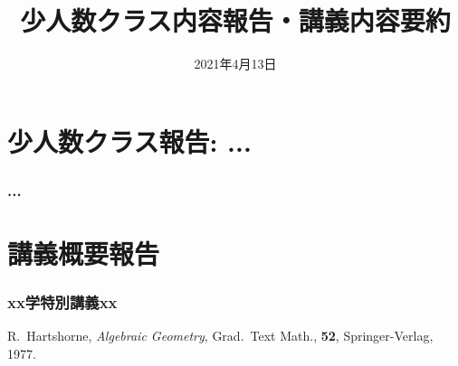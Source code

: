 \documentclass[final,dvipdfmx]{jlreq}
\title{少人数クラス内容報告・講義内容要約}
\author{}%
\date{2021年4月13日}%
\numberwithin{equation}{section}
\numberwithin{figure}{section}
\numberwithin{table}{section}
\theoremstyle{definition}
\begin{document}
\maketitle

\newpage
\setcounter{tocdepth}{2}
\tableofcontents


\newpage
\part{少人数クラス報告: ...}


\section{...}

\newpage
\part{講義概要報告}

\section{xx学特別講義xx}

\newpage
{}
\begin{thebibliography}{MMN}
R.~Hartshorne, \emph{Algebraic Geometry},
Grad.\ Text Math., \textbf{52}, Springer-Verlag, 1977.
\end{thebibliography}
\end{document}
